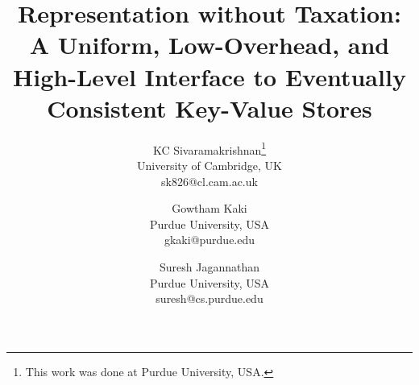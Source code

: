 \documentclass[11pt]{article}
\date{}
\begin{document}
\title{Representation without Taxation: A Uniform, Low-Overhead, and
High-Level Interface to Eventually Consistent Key-Value Stores}

\author{
  KC Sivaramakrishnan\thanks{This work was done at Purdue University, USA.} \\ 
  \small{University of Cambridge, UK}\\
  \small{{sk826@cl.cam.ac.uk}} 
  \and
  Gowtham Kaki \\ 
  \small{Purdue University, USA}\\
  \small{{gkaki@purdue.edu}} 
  \and
  Suresh Jagannathan\\
  \small{Purdue University, USA}\\
  \small{{suresh@cs.purdue.edu}} 
}


\maketitle
\end{document}
